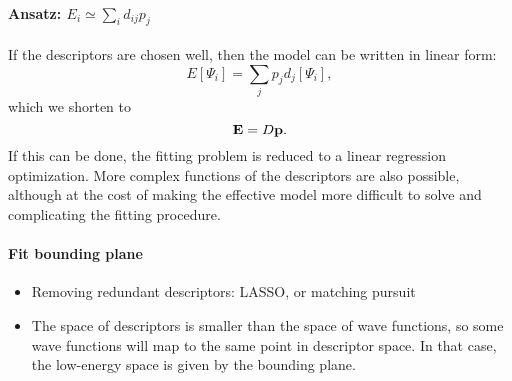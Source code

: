 \paragraph{Ansatz: $E_i \simeq \sum_i  d_{ij} p_j$} 
If the descriptors are chosen well, then the model can be written in linear form:
\begin{equation}
E[\Psi_i] = \sum_j p_j d_j[\Psi_i],	
\end{equation}
which we shorten to 
\begin{equation}
{\bf E} = D{\bf p} .
\end{equation}
If this can be done, the fitting problem is reduced to a linear regression optimization.
More complex functions of the descriptors are also possible, although at the cost of making the effective model more difficult to solve and complicating the fitting procedure.


\paragraph{Fit bounding plane}
\begin{itemize}
\item Removing redundant descriptors: LASSO, or matching pursuit
\item The space of descriptors is smaller than the space of wave functions, so some wave functions will map to the same point in descriptor space. In that case, the low-energy space is given by the bounding plane.
\end{itemize}

